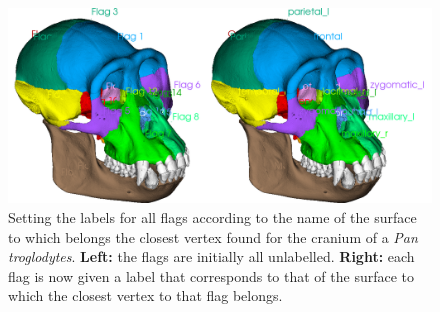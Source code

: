 \begin{figure}
  \centering
  \includegraphics[scale=0.31]{images/10/edit_flag_label_closest_vertex.png} 
	\caption{Setting the labels for all flags according to the name of the surface to which belongs the closest  vertex found for the cranium of a \textit{Pan troglodytes}.  \textbf{Left:} the flags are initially all  unlabelled. \textbf{Right:} each flag is now given a label that corresponds to that of the surface to which the closest vertex to that flag belongs.}
\label{flag_color_closest_vertex}
\end{figure}

